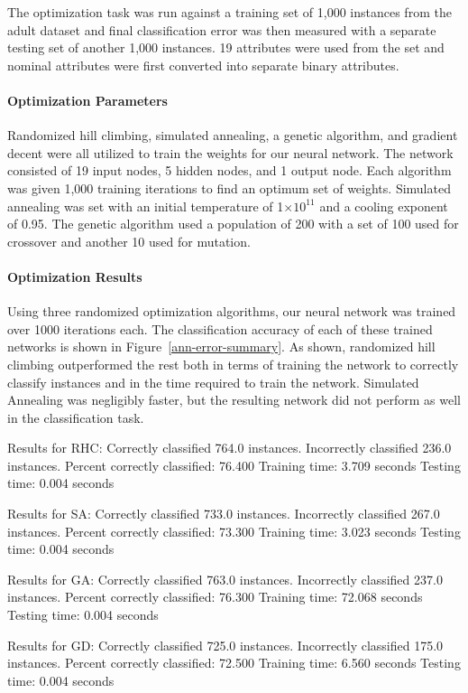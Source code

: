 \documentclass{sig-alternate}
\providecommand{\e}[1]{\ensuremath{\times 10^{#1}}}
\begin{document}
The optimization task was run against a training set of 1,000 instances from the adult dataset and final classification error was then measured with a separate testing set of another 1,000 instances. 19 attributes were used from the set and nominal attributes were first converted into separate binary attributes.

\paragraph{Optimization Parameters}

Randomized hill climbing, simulated annealing, a genetic algorithm, and gradient decent were all utilized to train the weights for our neural network. The network consisted of 19 input nodes, 5 hidden nodes, and 1 output node. Each algorithm was given 1,000 training iterations to find an optimum set of weights. Simulated annealing was set with an initial temperature of 1\e{11} and a cooling exponent of 0.95. The genetic algorithm used a population of 200 with a set of 100 used for crossover and another 10 used for mutation.

\paragraph{Optimization Results}

Using three randomized optimization algorithms, our neural network was trained over 1000 iterations each. The classification accuracy of each of these trained networks is shown in Figure~\ref{ann-error-summary}. As shown, randomized hill climbing outperformed the rest both in terms of training the network to correctly classify instances and in the time required to train the network. Simulated Annealing was negligibly faster, but the resulting network did not perform as well in the classification task.

\begin{verbbox}
Results for RHC: 
Correctly classified 764.0 instances.
Incorrectly classified 236.0 instances.
Percent correctly classified: 76.400%
Training time: 3.709 seconds
Testing time: 0.004 seconds

Results for SA: 
Correctly classified 733.0 instances.
Incorrectly classified 267.0 instances.
Percent correctly classified: 73.300%
Training time: 3.023 seconds
Testing time: 0.004 seconds

Results for GA: 
Correctly classified 763.0 instances.
Incorrectly classified 237.0 instances.
Percent correctly classified: 76.300%
Training time: 72.068 seconds
Testing time: 0.004 seconds

Results for GD: 
Correctly classified 725.0 instances.
Incorrectly classified 175.0 instances.
Percent correctly classified: 72.500%
Training time: 6.560 seconds
Testing time: 0.004 seconds
\end{verbbox}
\end{document}
